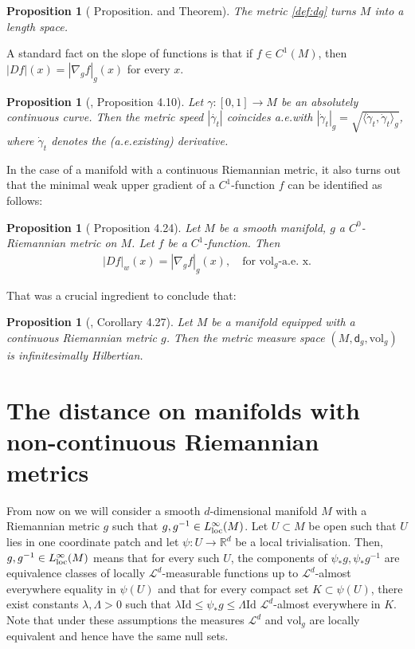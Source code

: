 \documentclass[a4paper,10pt]{article}
\newtheorem{proposition}[theorem]{Proposition}
\numberwithin{equation}{section}
\newcommand{\R}{\mathbb{R}}
\newcommand{\vol}{\mathrm{vol}}
\newcommand{\sfd}{\mathsf d}
\begin{document}
\begin{proposition}[\cite{burtscher2012length} Proposition. and Theorem]\label{length_space}
    The metric \eqref{def:dg} turns $M$ into a length space.
\end{proposition} 
 A standard fact on the slope of functions is that if $f \in C^1(M)$, then  $|Df|(x) = |\nabla_g f|_g(x)$ for every $x$.
\smallskip
 
\begin{proposition}[\cite{burtscher2012length}, Proposition 4.10]\label{metric_speed_explicit}
    Let $\gamma:[0, 1]\to M$ be an absolutely continuous curve. Then the metric speed $|\dot{\gamma_t}|$ coincides a.e.\;with $|\dot{\gamma}_t|_g = \sqrt{\langle  \dot{\gamma}_t, \dot{\gamma}_t\rangle_g}$, where $\dot{\gamma}_t$ denotes the (a.e.\;existing) derivative. 
\end{proposition}
In the case of a manifold with a continuous Riemannian metric, it also turns out that the minimal weak upper gradient of a $C^1$-function $f$ can be identified as follows:
\begin{proposition}[\cite{mondino2025equivalence} Proposition 4.24]\label{weakgradientforc1}
    Let $M$ be a smooth manifold, $g$ a $C^0$-Riemannian metric on $M$.
    Let $f$ be a $C^1$-function. Then 
    \begin{align*}
        |Df|_w(x) = |\nabla_g f|_g(x), \quad {\text{for $\vol_g$-a.e. x.}}
    \end{align*}
\end{proposition}
That was a crucial ingredient to conclude that: 
\smallskip

\begin{proposition}[\cite{mondino2025equivalence}, Corollary 4.27]
    Let $M$ be a manifold equipped with a continuous Riemannian metric $g$. Then the metric measure space $(M, \sfd_g, \vol_g)$ is infinitesimally Hilbertian. 
\end{proposition}

\section{The distance on manifolds with non-continuous Riemannian metrics}\label{sec:3}
From now on we will consider a smooth $d$-dimensional manifold $M$ with a Riemannian metric $g$ such that $g, g^{-1} \in L^\infty_{\rm loc}(M)$. 
Let $U \subset M$ be open such that $U$ lies in one coordinate patch and let $\psi: U \to \R^d$ be a local trivialisation. Then, $g, g^{-1} \in L^\infty_{\rm loc}(M)$ means that for every such $U$, the components of $\psi_*g, \psi_*g^{-1}$ are equivalence classes of locally $\mathcal{L}^d$-measurable functions up to $\mathcal{L}^d$-almost everywhere equality in $\psi(U)$ and that for every compact set $K \subset \psi(U)$, there exist constants $\lambda, \Lambda >0$ such that $\lambda \mathrm{Id} \leq \psi_*g \leq \Lambda \mathrm{Id}$ $\mathcal{L}^d$-almost everywhere in $K$. Note that under these assumptions the measures $\mathcal{L}^d$ and $\vol_g$ are locally equivalent and hence have the same null sets.
\end{document}
